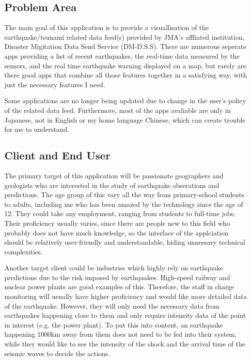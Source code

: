 \documentclass{article}
\begin{document}
\subsection{Problem Area}
The main goal of this application is to provide a visuallisation of the earthquake/tsunami related data feed(s) provided by JMA's affliated institution, Disaster Migitation Data Send Service (DM-D.S.S). There are numerous seperate apps providing a list of recent earthquakes, the real-time data measured by the sensors, and the real time earthquake warning displayed on a map, but rarely are there good apps that combine all those features together in a satisfying way, with just the necessary features I need.

Some applications are no longer being updated due to change in the user's policy of the related data feed. Furthermore, most of the apps avaliable are only in Japanese, not in English or my home language Chinese, which can create trouble for me to understand.

\subsection{Client and End User}
The primary target of this application will be passionate geographers and geologists who are interested in the study of earthquake obserations and predictions. The age group of this vary all the way from primary-school students to adults, including me who has been amazed by the technology since the age of 12. They could take any employment, ranging from students to full-time jobs. Their proficiency usually varies, since there are people new to this field who probably does not have much knowledge, so the interface of the applciation should be relatively user-friendly and understandable, hiding unnessary technical complexities.

Another target client could be industries which highly rely on earthquake predictions due to the risk imposed by earthquakes. High-speed railway and nuclear power plants are good examples of this. Therefore, the staff in charge monitoring will usually have higher proficiency and would like more detailed data of the earthquake. However, they will only need the necessary data from earthquakes happening close to them and only require intensity data of the point in interest (e.g. the power plant). To put this into content, an earthquake happening 1000km away from them does not need to be fed into their system, while they would like to see the intensity of the shock and the arrival time of the seismic waves to decide the actions.
\end{document}
